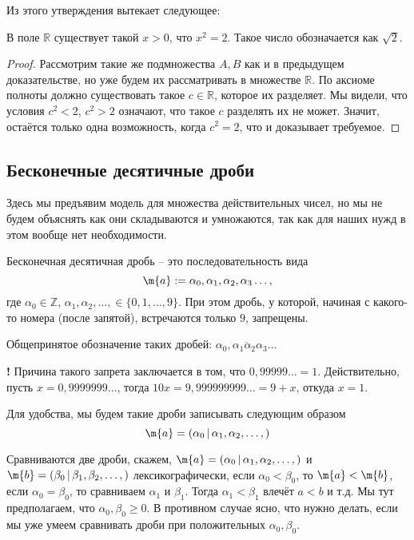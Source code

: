 Из этого утверждения вытекает следующее:

\begin{corollary}
    В поле $\mathbb{R}$ существует такой $x>0$, что $x^2 = 2$. Такое число обозначается как $\sqrt{2}.$
\end{corollary}
\begin{proof}
 Рассмотрим такие же подмножества $A,B$ как и в предыдущем доказательстве, но уже будем их рассматривать в множестве $\mathbb{R}$. По аксиоме полноты должно существовать такое $c\in \mathbb{R}$, которое их разделяет.  Мы видели, что условия $c^2<2$, $c^2>2$ означают, что такое $c$ разделять их не может. Значит, остаётся только одна возможность, когда $c^2 =2$, что и доказывает требуемое.
\end{proof}

\subsection{Бесконечные десятичные дроби}\label{model_of_R}

Здесь мы предъявим модель для множества действительных чисел, но мы не будем объяснять как они складываются и умножаются, так как для наших нужд в этом вообще нет необходимости.


\begin{definition}
    Бесконечная десятичная дробь -- это последовательность вида
    \[
     \m{a}:=\alpha_0,\alpha_1, \alpha_2, \alpha_3\ldots,
    \]
где $\alpha_0 \in \mathbb{Z}$, $\alpha_1,\alpha_2,\ldots, \in \{0,1,\ldots, 9\}$. При этом дробь, у которой, начиная с какого-то номера (после запятой), встречаются только $9$, запрещены.

Общепринятое обозначение таких дробей: $\overline{\alpha_0,\alpha_1\alpha_2\alpha_3\ldots}$
\end{definition}



\begin{mydanger}{\bf{!}}
    Причина такого запрета заключается в том, что $0,99999\ldots = 1$. Действительно, пусть $x = 0,9999999\ldots$, тогда $10x = 9,999999999\ldots = 9 + x$, откуда $x=1$.
\end{mydanger}

Для удобства, мы будем такие дроби записывать следующим образом
\[
 \m{a} = (\alpha_0 \,|\, \alpha_1, \alpha_2,\ldots,)
\]

Сравниваются две дроби, скажем, $\m{a} = (\alpha_0 \,|\, \alpha_1, \alpha_2,\ldots,)$ и $\m{b} = (\beta_0 \,|\, \beta_1, \beta_2,\ldots,)$ лексикографически, \ie если $\alpha_0<\beta_0$, то $\m{a}<\m{b}$, если $\alpha_0=\beta_0$, то сравниваем $\alpha_1$ и $\beta_1$. Тогда $\alpha_1<\beta_1$ влечёт $a<b$ и т.д. Мы тут предполагаем, что $\alpha_0,\beta_0 \ge 0$. В противном случае ясно, что нужно делать, если мы уже умеем сравнивать дроби при положительных $\alpha_0,\beta_0.$

